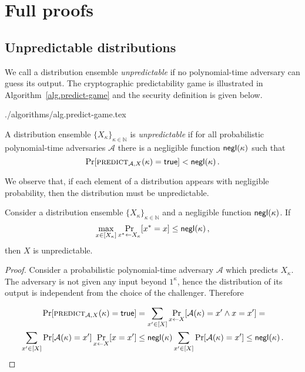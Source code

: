 \section{Full proofs}

\subsection{Unpredictable distributions}

We call a distribution ensemble \emph{unpredictable} if no
polynomial-time adversary can guess its output. The cryptographic
predictability game is illustrated in Algorithm~\ref{alg.predict-game} and the
security definition is given below.

{./algorithms/alg.predict-game.tex}

\begin{definition}
  A distribution ensemble $\{X_{\kappa}\}_{\kappa\in\mathbb{N}}$ is
  \emph{unpredictable} if for all probabilistic polynomial-time adversaries
  $\mathcal{A}$ there is a negligible function $\textsf{negl}(\kappa)$ such that
  \[\Pr[\textsc{predict}_{\mathcal{A},X}(\kappa) = \mathsf{true}] < \textsf{negl}(\kappa)\,.\]
\end{definition}

We observe that, if each element of a distribution appears with negligible
probability, then the distribution must be unpredictable.

\begin{lem}\label{lem:negl-unpred}
  Consider a distribution ensemble $\{X_{\kappa}\}_{\kappa\in\mathbb{N}}$ and
  a negligible function $\textsf{negl}(\kappa)$. If
  \[\max_{x \in [X_\kappa]}\Pr_{x^* \gets X_\kappa}[x^* = x] \leq \textsf{negl}(\kappa)\,,\]
  then $X$ is unpredictable.
\end{lem}
\begin{proof}
  Consider a probabilistic polynomial-time adversary $\mathcal{A}$ which
  predicts $X_\kappa$. The adversary is not given any input beyond $1^\kappa$,
  hence the distribution of its output is independent from the choice of the
  challenger. Therefore

  \begin{align*}
  \Pr[\textsc{predict}_{\mathcal{A},X}(\kappa) = \mathsf{true}] &=
  \sum_{x' \in [X]}\Pr_{x \gets X}[\mathcal{A}(\kappa) = x'\land x = x'] =\\
  \sum_{x' \in [X]}\Pr[\mathcal{A}(\kappa) = x']\Pr_{x \gets X}[x = x']
  &\leq \textsf{negl}(\kappa)\sum_{x' \in [X]}\Pr[\mathcal{A}(\kappa) = x']
  \leq \textsf{negl}(\kappa)
  \,.
  \end{align*}
\end{proof}

